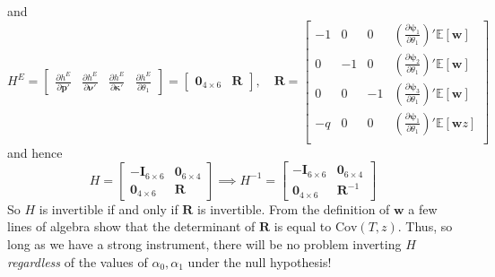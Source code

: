 \documentclass[12pt]{article}
\begin{document}
and
\[
  H^E = \left[
  \begin{array}{cccc}
    \displaystyle \frac{\partial h^E}{\partial \mathbf{p}'} & 
    \displaystyle \frac{\partial h^E}{\partial \boldsymbol{\nu}'} &
    \displaystyle \frac{\partial h^E}{\partial \boldsymbol{\kappa}'} &
    \displaystyle \frac{\partial h^E}{\partial \theta_1}
  \end{array}
\right] = \left[
\begin{array}{cc}
  \mathbf{0}_{4\times 6} & \mathbf{R}
\end{array}
\right], \quad
\mathbf{R} = \left[
\begin{array}{rrrr}
  -1 & 0 & 0 
  & \displaystyle \left(\frac{\partial \boldsymbol{\psi}_1}{\partial \theta_1}\right)'\mathbb{E}[\mathbf{w}]\\
   0 & -1 & 0 & \displaystyle \left(\frac{\partial \boldsymbol{\psi}_2}{\partial \theta_1}\right)'\mathbb{E}[\mathbf{w}]\\
   0 & 0 & -1 & \displaystyle \left(\frac{\partial \boldsymbol{\psi}_3}{\partial \theta_1}\right)'\mathbb{E}[\mathbf{w}]\\
   -q & 0 & 0 &  \displaystyle \left(\frac{\partial \boldsymbol{\psi}_1}{\partial \theta_1}\right)'\mathbb{E}[\mathbf{w}z]\\
\end{array}
\right]
\]
and hence
\[
  H = \left[
  \begin{array}{rr}
    -\mathbf{I}_{6\times 6} & \mathbf{0}_{6\times 4}\\
    \mathbf{0}_{4\times 6} & \mathbf{R}
  \end{array}
\right] \implies H^{-1} =
  \left[\begin{array}{rr}
    -\mathbf{I}_{6\times 6} & \mathbf{0}_{6\times 4}\\
    \mathbf{0}_{4\times 6} & \mathbf{R}^{-1}
\end{array}\right]
\]
So $H$ is invertible if and only if $\mathbf{R}$ is invertible.
From the definition of $\mathbf{w}$ a few lines of algebra show that the determinant of $\mathbf{R}$ is equal to $\mbox{Cov}(T,z)$.
Thus, so long as we have a strong instrument, there will be no problem inverting $H$ \emph{regardless} of the values of $\alpha_0,\alpha_1$ under the null hypothesis!
\end{document}
